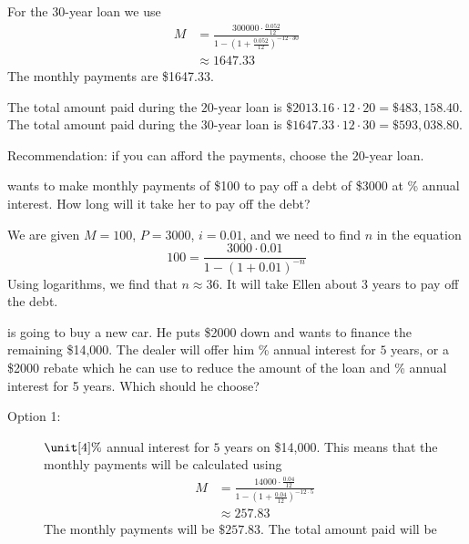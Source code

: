 \begin{problem}
\begin{subproblem}
\begin{shortsolution}
		For the $30$-year loan we use
		\begin{align*}
			M & = \frac{300000\cdot \frac{0.052}{12}}{1-\left( 1+\frac{0.052}{12} \right)^{-12\cdot 30}} \\
			  & \approx 1647.33                                                                          
		\end{align*}
		The monthly payments are \$1647.33.
		
		The total amount paid during the $20$-year loan is $\$2013.16\cdot 12\cdot 20=\$483,158.40$. 
		The total amount paid during the $30$-year loan is $\$1647.33\cdot 12\cdot 30=\$593,038.80$.
		
		Recommendation: if you can afford the payments, choose the $20$-year loan.
	\end{shortsolution}
\end{subproblem}
\begin{subproblem}
	 wants to make monthly payments of \$100 to pay off a debt of \$3000 
	at \unit[12]{\%} annual interest. How long will it take her to pay off the 
	debt?
	\begin{shortsolution}
		We are given $M=100$, $P=3000$, $i=0.01$, and we need to find $n$
		in the equation
		\[
			100 = \frac{3000\cdot 0.01}{1-(1+0.01)^{-n}}
		\]
		Using logarithms, we find that $n\approx 36$. It will take 
		Ellen about $3$ years to pay off the debt.
	\end{shortsolution}
\end{subproblem}
\begin{subproblem}
	 is going to buy a new car. He puts \$2000 down and wants to finance the
	remaining \$14,000. The dealer will offer him \unit[4]{\%} annual interest for 
	$5$ years, or a \$2000
	rebate which he can use to reduce the amount of the loan and \unit[8]{\%} 
	annual interest for 5 years. Which should he choose?
	\begin{shortsolution}
		\begin{description}
			\item[Option 1:] $\unit[4]{\%}$ annual interest for $5$ years on \$14,000.
			This means that the monthly payments will be calculated using
			\begin{align*}
				M & = \frac{14000\cdot \frac{0.04}{12}}{1-\left( 1+\frac{0.04}{12} \right)^{-12\cdot 5}} \\
				  & \approx 257.83                                                                       
			\end{align*}
			The monthly payments will be $\$257.83$. The total amount paid will be

\end{description}
\end{shortsolution}
\end{subproblem}
\end{problem}

